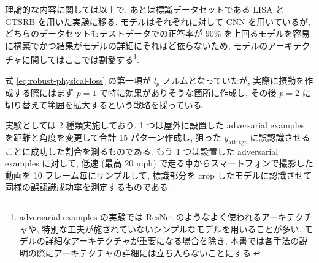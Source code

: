 理論的な内容に関しては以上で, あとは標識データセットである LISA \cite{mogelmose2012vision} と GTSRB \cite{stallkamp2012man} を用いた実験に移る.
モデルはそれぞれに対して CNN を用いているが, どちらのデータセットもテストデータでの正答率が 90\% を上回るモデルを容易に構築でかつ結果がモデルの詳細にそれほど依らないため, モデルのアーキテクチャに関してはここでは割愛する\footnote{
adversarial examples の実験では ResNet のようなよく使われるアーキテクチャや, 特別な工夫が施されていないシンプルなモデルを用いることが多い.
モデルの詳細なアーキテクチャが重要になる場合を除き, 本書では各手法の説明の際にアーキテクチャの詳細には立ち入らないことにする.
}.

式 \ref{eq:robust-physical-loss} の第一項が $l_p$ ノルムとなっていたが, 実際に摂動を作成する際にはまず $p = 1$ で特に効果がありそうな箇所に作成し, その後 $p = 2$ に切り替えて範囲を拡大するという戦略を採っている.

実験としては 2 種類実施しており, 1 つは屋外に設置した adversarial examples を距離と角度を変更して合計 15 パターン作成し, 狙った $y_{\text{atk-tgt}}$ に誤認識させることに成功した割合を測るものである.
もう 1 つは設置した adversarial examples に対して, 低速 (最高 20 mph) で走る車からスマートフォンで撮影した動画を 10 フレーム毎にサンプルして, 標識部分を crop したモデルに認識させて同様の誤認識成功率を測定するものである.


